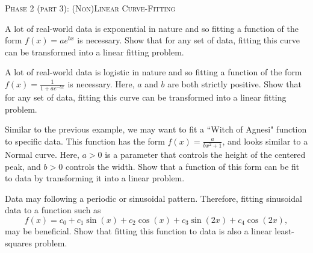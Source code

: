 \documentclass[10pt]{article}
\begin{document}
\begin{center}
\Large{\textsc{Phase 2 (part 3): (Non)Linear Curve-Fitting}}\\
\end{center}

\begin{enumerate}[{$1.]$}]

\item A lot of real-world data is exponential in nature and so fitting a function of the form $f(x) =  ae^{bx}$ is necessary.  Show that for any set of data, fitting this curve can be transformed into a linear fitting problem. \vfill


\item A lot of real-world data is logistic in nature and so fitting a function of the form $f(x) = \displaystyle \frac{1}{1 + ae^{-bx}}$ is necessary.  Here, $a$ and $b$ are both strictly positive.  Show that for any set of data, fitting this curve can be transformed into a linear fitting problem. \vfill



\pagebreak

\item Similar to the previous example, we may want to fit a ``Witch of Agnesi" function to specific data.  This function has the form $\displaystyle f(x) = \frac{a}{bx^2 + 1}$, and looks similar to a Normal curve.  Here, $a>0$ is a parameter that controls the height of the centered peak, and $b>0$ controls the width.  Show that a function of this form can be fit to data by transforming it into a linear problem. \vfill



\item Data may following a periodic or sinusoidal pattern.  Therefore, fitting sinusoidal data to a function such as 
\[ f(x) = c_0 + c_1\sin(x) + c_2\cos(x) + c_3\sin(2x) + c_4\cos(2x), \]
may be beneficial.  Show that fitting this function to data is also a linear least-squares problem. \vfill





\end{enumerate}
\end{document}
